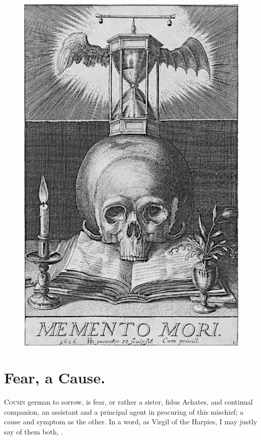 {\begin{figure}[p]
  \begingroup
  \centering
  \includegraphics[keepaspectratio,width=\textwidth]{figures/memento-mori-small.jpg}
  \label{fig:mementomori}
\end{figure}

\section{Fear, a Cause.}

\lettrine{C}{ousin} german to sorrow, is fear, or rather a sister, fidus Achates,
and continual companion, an assistant and a principal agent in
procuring of this mischief; a cause and symptom as the other. In a
word, as Virgil of the Harpies, I may justly say of them both,
.

}

